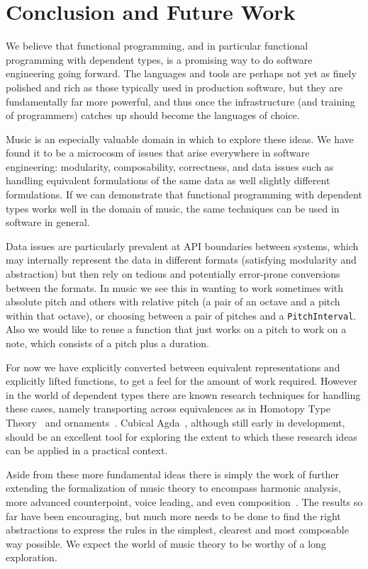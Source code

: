 \section{Conclusion and Future Work}
\label{sec:conclusion}

We believe that functional programming, and in particular functional
programming with dependent types, is a promising way to do software
engineering going forward. The languages and tools are perhaps not yet
as finely polished and rich as those typically used in production
software, but they are fundamentally far more powerful, and thus once
the infrastructure (and training of programmers) catches up should
become the languages of choice.

Music is an especially valuable domain in which to explore these
ideas. We have found it to be a microcosm of issues that arise
everywhere in software engineering: modularity, composability,
correctness, and data issues such as handling equivalent formulations of
the same data as well slightly different formulations. If we can
demonstrate that functional programming with dependent types works
well in the domain of music, the same techniques can be used in
software in general.

Data issues are particularly prevalent at API boundaries between
systems, which may internally represent the data in different formats
(satisfying modularity and abstraction) but then rely on tedious and
potentially error-prone conversions between the formats. In music
we see this in wanting to work sometimes with absolute pitch and others
with relative pitch (a pair of an octave and a pitch within that
octave), or choosing between
a pair of pitches and a \texttt{PitchInterval}. Also we would like to
reuse a function that just works on a pitch to work on a note, which
consists of a pitch plus a duration.

For now we have explicitly converted between equivalent representations
and explicitly lifted functions, to get a feel for the amount of work
required.  However in the world of dependent types there are known
research techniques for handling these cases, namely transporting
across equivalences as in Homotopy Type Theory~\citep{hottbook} and
ornaments~\citep{dagand-ornaments}. Cubical
Agda~\citep{vezzosi-cubical}, although still early in development,
should be an excellent tool for exploring the extent to which these
research ideas can be applied in a practical context.

Aside from these more fundamental ideas there is simply the work of
further extending the formalization of music theory to encompass
harmonic analysis, more advanced counterpoint, voice leading, and even
composition~\citep{schoenberg-fundamentals}. The results so far have
been encouraging, but much more needs to be done to find the right
abstractions to express the rules in the simplest, clearest and most
composable way possible.
We expect the world of music theory to be worthy of a long exploration.

